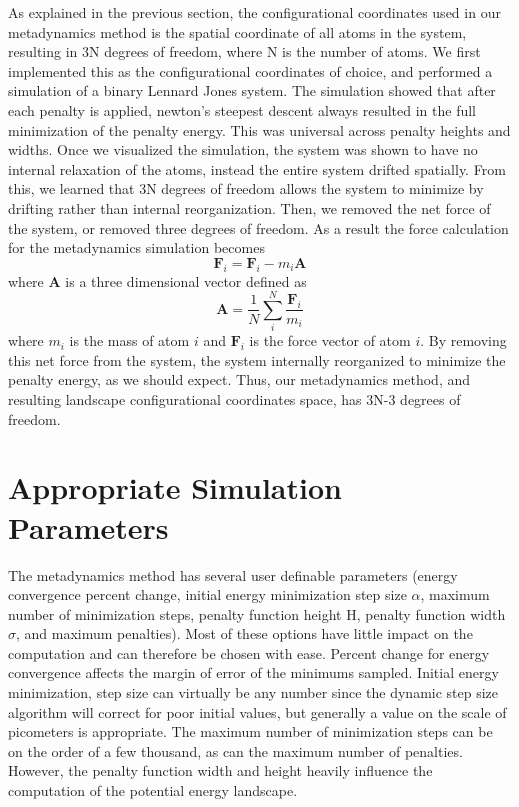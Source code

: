 As explained in the previous section, the configurational coordinates used in our metadynamics method is the spatial coordinate of all atoms in the system, resulting in 3N degrees of freedom, where N is the number of atoms.   We first implemented this as the configurational coordinates of choice, and performed a simulation of a binary Lennard Jones system.  The simulation showed that after each penalty is applied, newton's steepest descent always resulted in the full minimization of the penalty energy.  This was universal across penalty heights and widths.  Once we visualized the simulation, the system was shown to have no internal relaxation of the atoms, instead the entire system drifted spatially.  From this, we learned that 3N degrees of freedom allows the system to minimize by drifting rather than internal reorganization.  Then, we removed the net force of the system, or removed three degrees of freedom.  As a result the force calculation for the metadynamics simulation becomes
\begin{equation}
	\mathbf{F}_i = \mathbf{F}_i - m_i\mathbf{A}
\end{equation}
where $\mathbf{A}$ is a three dimensional vector defined as
\begin{equation}
	\mathbf{A} = \frac{1}{N}\sum_{i}^N\frac{\mathbf{F}_i}{m_i}
\end{equation}
where $m_i$ is the mass of atom $i$ and $\mathbf{F}_i$ is the force vector of atom $i$.  By removing this net force from the system, the system internally reorganized to minimize the penalty energy, as we should expect.  Thus, our metadynamics method, and resulting landscape configurational coordinates space, has 3N-3 degrees of freedom.  

\section{Appropriate Simulation Parameters}
The metadynamics method has several user definable parameters (energy convergence percent change, initial energy minimization step size $\alpha$, maximum number of minimization steps, penalty function height H, penalty function width $\sigma$, and maximum penalties).  Most of these options have little impact on the computation and can therefore be chosen with ease.  Percent change for energy convergence affects the margin of error of the minimums sampled.  Initial energy minimization, step size can virtually be any number since the dynamic step size algorithm will correct for poor initial values, but generally a value on the scale of picometers is appropriate.  The maximum number of minimization steps can be on the order of a few thousand, as can the maximum number of penalties.  However, the penalty function width and height heavily influence the computation of the potential energy landscape.  

